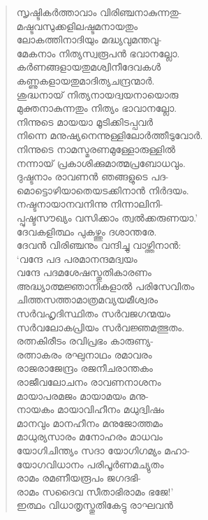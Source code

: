 \begin{verse}
സൃഷ്ടികര്‍ത്താവാം വിരിഞ്ചനാകുന്നതു-\\
മഷ്ടവസുക്കളിലഷ്ടമനായതും\\
ലോകത്തിനാദിയും മദ്ധ്യവുമന്തവു-\\
മേകനാം നിത്യസ്വരൂപന്‍ ഭവാനല്ലോ.\\
കര്‍ണങ്ങളായതുമശ്വിനീദേവകള്‍\\
കണ്ണുകളായതുമാദിത്യചന്ദ്രന്മാര്‍.\\
ശുദ്ധനായ് നിത്യനായദ്വയനായൊരു\\
മുക്തനാകുന്നതും നിത്യം ഭാവാനല്ലോ.\\
നിന്നുടെ മായയാ മൂടിക്കിടപ്പവര്‍\\
നിന്നെ മനുഷ്യനെന്നുള്ളിലോര്‍ത്തീടുവോര്‍.\\
നിന്നുടെ നാമസ്മരണമുള്ളോരുള്ളില്‍\\
നന്നായ് പ്രകാശിക്കുമാത്മപ്രബോധവും.\\
ദുഷ്ടനാം രാവണന്‍ ഞങ്ങളുടെ പദ-\\
മൊട്ടൊഴിയാതെയടക്കിനാന്‍ നിര്‍ദയം.\\
നഷ്ടനായാനവനിന്നു നിന്നാലിനി-\\
പ്പുഷ്ടസൗഖ്യം വസിക്കാം ത്വല്‍ക്കരുണയാ.’\\
ദേവകളിത്ഥം പുകഴ്ത്തും ദശാന്തരേ.\\
ദേവന്‍ വിരിഞ്ചനും വന്ദിച്ചു വാഴ്ത്തിനാന്‍:\\
‘വന്ദേ പദ പരമാനന്ദമദ്വയം\\
വന്ദേ പദമശേഷസ്തുതികാരണം\\
അദ്ധ്യാത്മജ്ഞാനികളാല്‍ പരിസേവിതം\\
ചിത്തസത്താമാത്രമവ്യയമീശ്വരം\\
സര്‍വഹൃദിസ്ഥിതം സര്‍വജഗന്മയം\\
സര്‍വലോകപ്രിയം സര്‍വജ്ഞമത്ഭുതം.\\
രത്നകിരീടം രവിപ്രഭം കാരുണ്യ-\\
രത്നാകരം രഘുനാഥം രമാവരം\\
രാജരാജേന്ദ്രം രജനീചരാന്തകം\\
രാജീവലോചനം രാവണനാശനം\\
മായാപരമജം മായാമയം മനു-\\
നായകം മായാവിഹീനം മധുദ്വിഷം\\
മാനവും മാനഹീനം മനുജോത്തമം\\
മാധുര്യസാരം മനോഹരം മാധവം\\
യോഗിചിന്ത്യം സദാ യോഗിഗമ്യം മഹാ-\\
യോഗവിധാനം പരിപൂര്‍ണമച്യുതം\\
രാമം രമണീയരൂപം ജഗദഭി-\\
രാമം സദൈവ സീതാഭിരാമം ഭജേ!’\\
ഇത്ഥം വിധാതൃസ്തുതികേട്ടു രാഘവന്‍\\

\end{verse}
